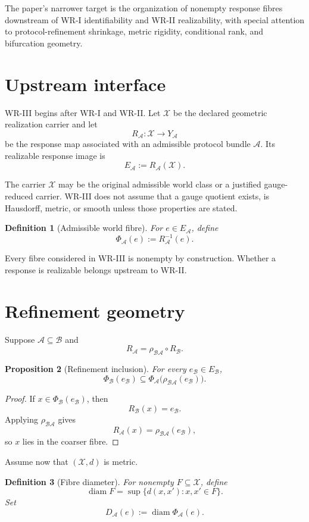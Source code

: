 \documentclass[11pt]{article}
\newtheorem{definition}{Definition}[section]
\newtheorem{proposition}[definition]{Proposition}
\newcommand{\X}{\mathcal X}
\newcommand{\Acal}{\mathcal A}
\newcommand{\Bcal}{\mathcal B}
\begin{document}
The paper's narrower target is the organization of nonempty response fibres
downstream of WR-I identifiability and WR-II realizability, with special
attention to protocol-refinement shrinkage, metric rigidity, conditional rank,
and bifurcation geometry.
\section{Upstream interface}

WR-III begins after WR-I and WR-II. Let \(\X\) be the declared geometric
realization carrier and let
\[
R_{\Acal}:\X\to Y_{\Acal}
\]
be the response map associated with an admissible protocol bundle \(\Acal\).
Its realizable response image is
\[
E_{\Acal}:=R_{\Acal}(\X).
\]

The carrier \(\X\) may be the original admissible world class or a justified
gauge-reduced carrier. WR-III does not assume that a gauge quotient exists, is
Hausdorff, metric, or smooth unless those properties are stated.

\begin{definition}[Admissible world fibre]
For \(e\in E_{\Acal}\), define
\[
\Phi_{\Acal}(e):=R_{\Acal}^{-1}(e).
\]
\end{definition}

Every fibre considered in WR-III is nonempty by construction. Whether a
response is realizable belongs upstream to WR-II.

\section{Refinement geometry}

Suppose \(\Acal\subseteq\Bcal\) and
\[
R_{\Acal}
=
\rho_{\Bcal\Acal}\circ R_{\Bcal}.
\]

\begin{proposition}[Refinement inclusion]
For every \(e_{\Bcal}\in E_{\Bcal}\),
\[
\Phi_{\Bcal}(e_{\Bcal})
\subseteq
\Phi_{\Acal}\bigl(\rho_{\Bcal\Acal}(e_{\Bcal})\bigr).
\]
\end{proposition}

\begin{proof}
If \(x\in\Phi_{\Bcal}(e_{\Bcal})\), then
\[
R_{\Bcal}(x)=e_{\Bcal}.
\]
Applying \(\rho_{\Bcal\Acal}\) gives
\[
R_{\Acal}(x)=\rho_{\Bcal\Acal}(e_{\Bcal}),
\]
so \(x\) lies in the coarser fibre.
\end{proof}

Assume now that \((\X,d)\) is metric.

\begin{definition}[Fibre diameter]
For nonempty \(F\subseteq\X\), define
\[
\operatorname{diam}F
=
\sup\{d(x,x'):x,x'\in F\}.
\]
Set
\[
D_{\Acal}(e)
:=
\operatorname{diam}\Phi_{\Acal}(e).
\]
\end{definition}
\end{document}
